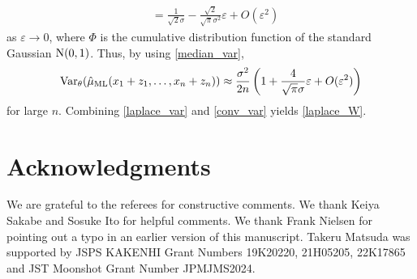 \documentclass[11pt, a4paper]{article}
\begin{document}
\begin{appendix}
\begin{align*}
		&= \frac{1}{\sqrt{2} \sigma} - \frac{\sqrt{2}}{\sqrt{\pi} \sigma^2} \varepsilon + O(\varepsilon^2)
	\end{align*}
	as $\varepsilon \to 0$, where $\Phi$ is the cumulative distribution function of the standard Gaussian ${\rm N}(0,1)$.
	Thus, by using \eqref{median_var},
	\begin{align}\label{conv_var}
		{\rm Var}_{\theta}(\hat{\mu}_{\mathrm{ML}}(x_1+z_1,\dots,x_n+z_n)) \approx \frac{\sigma^2}{2n} \left( 1+\frac{4}{\sqrt{\pi} \sigma} \varepsilon + O(\varepsilon^2) \right)
	\end{align}
	for large $n$.
	Combining \eqref{laplace_var} and \eqref{conv_var} yields \eqref{laplace_W}.	
\end{appendix}


	\section*{Acknowledgments}
	We are grateful to the referees for constructive comments.
We thank Keiya Sakabe and Sosuke Ito for helpful comments.
We thank Frank Nielsen for pointing out a typo in an earlier version of this manuscript.
Takeru Matsuda was supported by JSPS KAKENHI Grant Numbers 19K20220, 21H05205, 22K17865 and JST Moonshot Grant Number JPMJMS2024.
	
\end{document}
